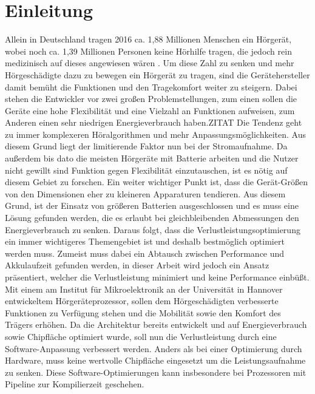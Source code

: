 
\thispagestyle{empty}
%
\chapter{Einleitung}
\label{chap:introduction}
Allein in Deutschland tragen 2016 ca. 1,88 Millionen Menschen ein Hörgerät, wobei noch ca. 1,39 Millionen Personen keine Hörhilfe tragen, die jedoch rein medizinisch auf dieses angewiesen wären \cite{statistica}. Um diese Zahl zu senken und mehr Hörgeschädigte dazu zu bewegen ein Hörgerät zu tragen, sind die Gerätehersteller damit bemüht die Funktionen und den Tragekomfort weiter zu steigern.
Dabei stehen die Entwickler vor zwei großen Problemstellungen, zum einen sollen die Geräte eine hohe Flexibilität und eine Vielzahl an Funktionen aufweisen, zum Anderen einen sehr niedrigen Energieverbrauch haben.ZITAT Die Tendenz geht zu immer komplexeren Höralgorithmen und mehr Anpassungsmöglichkeiten. Aus diesem Grund liegt der limitierende Faktor nun bei der Stromaufnahme.
Da außerdem bis dato die meisten Hörgeräte mit Batterie arbeiten und die Nutzer nicht gewillt sind Funktion gegen Flexibilität einzutauschen, ist es nötig auf diesem Gebiet zu forschen. Ein weiter wichtiger Punkt ist, dass die Gerät-Größen von den Dimensionen eher zu kleineren Apparaturen tendieren. Aus diesem Grund, ist der Einsatz von größeren Batterien ausgeschlossen und es muss eine Lösung gefunden werden, die es erlaubt bei gleichbleibenden Abmessungen den Energieverbrauch zu senken. Daraus folgt, dass die Verlustleistungsoptimierung ein immer wichtigeres Themengebiet ist und deshalb bestmöglich optimiert werden muss. 
Zumeist muss dabei ein Abtausch zwischen Performance und Akkulaufzeit gefunden werden, in dieser Arbeit wird jedoch ein Ansatz präsentiert, welcher die Verlustleistung minimiert und keine Performance einbüßt.\\
Mit einem am Institut für Mikroelektronik an der Universität in Hannover entwickeltem Hörgeräteprozessor, sollen dem Hörgeschädigten verbesserte Funktionen zu Verfügung stehen und die Mobilität sowie den Komfort des Trägers erhöhen. Da die Architektur bereits entwickelt und auf Energieverbrauch sowie Chipfläche optimiert wurde, soll nun die Verlustleistung durch eine Software-Anpassung verbessert werden. Anders als bei einer Optimierung durch Hardware, muss keine wertvolle Chipfläche eingesetzt um die Leistungsaufnahme zu senken. Diese Software-Optimierungen kann insbesondere bei Prozessoren mit Pipeline zur Kompilierzeit geschehen.\\
